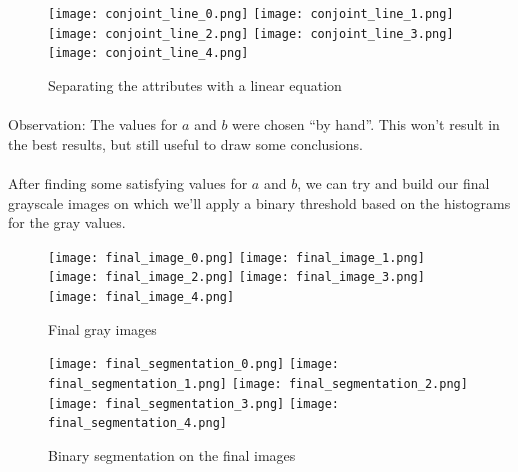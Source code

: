 \begin{figure}[h]
    \centering
    \texttt{[image: conjoint\_line\_0.png]}
    \texttt{[image: conjoint\_line\_1.png]}
    \texttt{[image: conjoint\_line\_2.png]}
    \texttt{[image: conjoint\_line\_3.png]}
    \texttt{[image: conjoint\_line\_4.png]}
    \caption{Separating the attributes with a linear equation}
    \label{}
\end{figure}


\paragraph{}
Observation: The values for $a$ and $b$ were chosen ``by hand''. This won't result in the best results, but still useful to draw some conclusions.

\paragraph{}
After finding some satisfying values for $a$ and $b$, we can try and build our final grayscale images on which we'll apply a binary threshold based on the histograms for the gray values.

\begin{figure}[h]
    \centering
    \texttt{[image: final\_image\_0.png]}
    \texttt{[image: final\_image\_1.png]}
    \texttt{[image: final\_image\_2.png]}
    \texttt{[image: final\_image\_3.png]}
    \texttt{[image: final\_image\_4.png]}
    \caption{Final gray images}
    \label{}
\end{figure}

\begin{figure}[h]
    \centering
    \texttt{[image: final\_segmentation\_0.png]}
    \texttt{[image: final\_segmentation\_1.png]}
    \texttt{[image: final\_segmentation\_2.png]}
    \texttt{[image: final\_segmentation\_3.png]}
    \texttt{[image: final\_segmentation\_4.png]}
    \caption{Binary segmentation on the final images}
    \label{}
\end{figure}